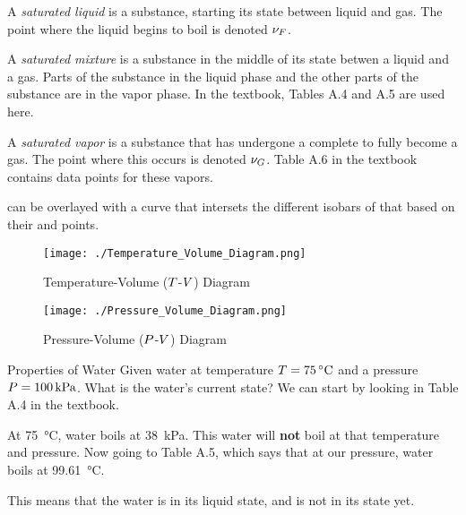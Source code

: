 \begin{definition}\label{def:Saturated_Liquid}
  A \emph{saturated liquid} is a substance, starting its  state between liquid and gas.
  The point where the liquid begins to boil is denoted $\nu_{F}$.
\end{definition}

\begin{definition}\label{def:Saturated_Mixture}
  A \emph{saturated mixture} is a substance in the middle of its  state betwen a liquid and a gas.
  Parts of the substance in the liquid phase and the other parts of the substance are in the vapor phase.
  In the textbook, Tables A.4 and A.5 are used here.
\end{definition}

\begin{definition}\label{def:Saturated_Vapor}
  A \emph{saturated vapor} is a substance that has undergone a complete  to fully become a gas.
  The point where this occurs is denoted $\nu_{G}$.
  Table A.6 in the textbook contains data points for these vapors.
\end{definition}

 can be overlayed with a curve that intersets the different isobars of that  based on their  and  points.

\begin{figure}[h!tbp]
  \centering
  \texttt{[image: ./Temperature\_Volume\_Diagram.png]}
  \caption{Temperature-Volume ($T$-$V$) Diagram}
  \label{fig:Temperature_Pressure_Diagram}
\end{figure}

\begin{figure}[h!tbp]
  \centering
  \texttt{[image: ./Pressure\_Volume\_Diagram.png]}
  \caption{Pressure-Volume ($P$-$V$) Diagram}
  \label{fig:Pressure_Volume_Diagram}
\end{figure}

\begin{example}{Properties of Water}
  Given water at temperature $\Temp = \SI{75}{\degreeCelsius}$ and a pressure $P = \SI{100}{\kilo\pascal}$.
  What is the water's current state?
  \tcblower{}
  We can start by looking in Table A.4 in the textbook.

  At \SI{75}{\degreeCelsius}, water boils at \SI{38}{\kilo\pascal}.
  This water will \textbf{not} boil at that temperature and pressure.
  Now going to Table A.5, which says that at our pressure, water boils at \SI{99.61}{\degreeCelsius}.

  This means that the water is in its liquid state, and is not in its  state yet.
\end{example}





